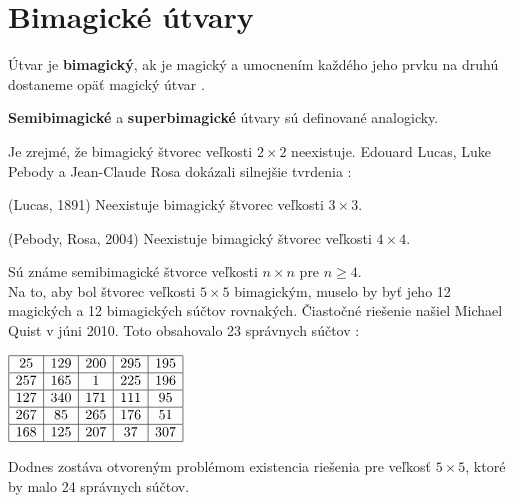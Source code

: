 \section{Bimagické útvary}
\begin{definition} Útvar je \textbf{bimagický}, ak je magický a umocnením každého jeho prvku na druhú dostaneme opäť magický útvar \cite{multimagie}.
\end{definition}

\begin{note} \textbf{Semibimagické} a \textbf{superbimagické} útvary sú definované analogicky.
\end{note}

Je zrejmé, že bimagický štvorec veľkosti $2 \times 2$ neexistuje. Edouard Lucas, Luke Pebody a Jean-Claude Rosa dokázali silnejšie tvrdenia \cite{multimagie}:

\begin{theorem} (Lucas, 1891) Neexistuje bimagický štvorec veľkosti $3 \times 3$.
\end{theorem}

\begin{theorem} (Pebody, Rosa, 2004) Neexistuje bimagický štvorec veľkosti $4 \times 4$.
\end{theorem}

Sú známe semibimagické štvorce veľkosti $n \times n$ pre $n \geq 4$. \\

Na to, aby bol štvorec veľkosti $5 \times 5$ bimagickým, muselo by byť jeho 12 magických a 12 bimagických súčtov rovnakých. Čiastočné riešenie našiel Michael Quist v júni 2010. Toto obsahovalo 23 správnych súčtov \cite{multimagie}:

\begin{center}
$\begin{array}{ |c|c|c|c|c| }
\hline
25 & 129 & 200 & 295 & 195 \\ 
\hline
257 & 165 & 1 & 225 & 196  \\ 
\hline
127 & 340 & 171 & 111 & 95 \\ 
\hline
267 & 85 & 265 & 176 & 51 \\ 
\hline
168 & 125 & 207 & 37 & 307 \\
\hline
\end{array}$
\end{center}

Dodnes zostáva otvoreným problémom existencia riešenia pre veľkosť $5 \times 5$, ktoré by malo 24 správnych súčtov. \\

